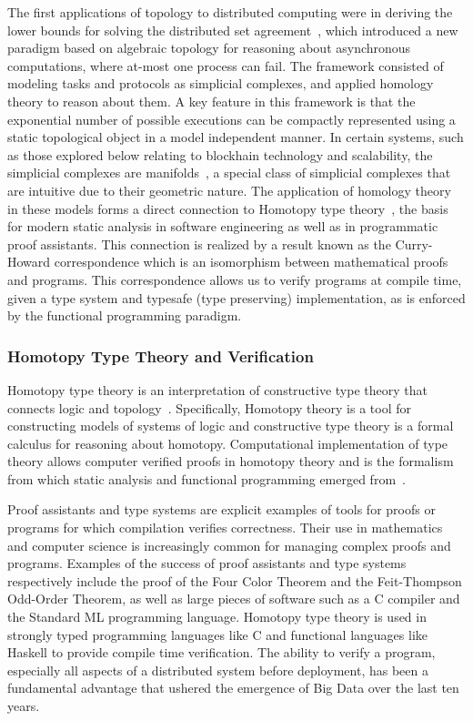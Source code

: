 \documentclass[runningheads]{llncs}
\begin{document}
The first applications of topology to distributed computing were in deriving the lower bounds for solving the distributed set agreement~\cite{ref_article12}, which introduced a new paradigm based on algebraic topology for reasoning about asynchronous computations, where at-most one process can fail. The framework consisted of modeling tasks and protocols as simplicial complexes, and applied homology~\cite{ref_article5,ref_article9} theory to reason about them. A key feature in this framework is that the exponential number of possible executions can be compactly represented using a static topological object in a model independent manner. In certain systems, such as those explored below relating to blockhain technology and scalability, the simplicial complexes are manifolds~\cite{ref_article6,ref_article7,ref_article8}, a special class of simplicial complexes that are intuitive due to their geometric nature. The application of homology theory in these models forms a direct connection to Homotopy type theory~\cite{ref_article9,ref_article10}, the basis for modern static analysis in software engineering as well as in programmatic proof assistants. This connection is realized by a result known as the Curry-Howard correspondence which is an isomorphism between mathematical proofs and programs. This correspondence allows us to verify programs at compile time, given a type system and typesafe (type preserving) implementation, as is enforced by the functional programming paradigm.

\subsubsection{Homotopy Type Theory and Verification}
Homotopy type theory is an interpretation of constructive type theory that connects logic and topology~\cite{ref_book1}. Specifically, Homotopy theory is a tool for constructing models of systems of logic and constructive type theory is a formal calculus for reasoning about homotopy. Computational implementation of type theory allows computer verified proofs in homotopy theory and is the formalism from which static analysis and functional programming emerged from~\cite{ref_article10}.

Proof assistants and type systems are explicit examples of tools for proofs or programs for which compilation verifies correctness. Their use in mathematics and computer science is increasingly common for managing complex proofs and programs. Examples of the success of proof assistants and type systems respectively include the proof of the Four Color Theorem and the Feit-Thompson Odd-Order Theorem, as well as large pieces of software such as a C compiler and the Standard ML programming language. Homotopy type theory is used in strongly typed programming languages like C and functional languages like Haskell to provide compile time verification. The ability to verify a program, especially all aspects of a distributed system before deployment, has been a fundamental advantage that ushered the emergence of Big Data over the last ten years.
\end{document}
